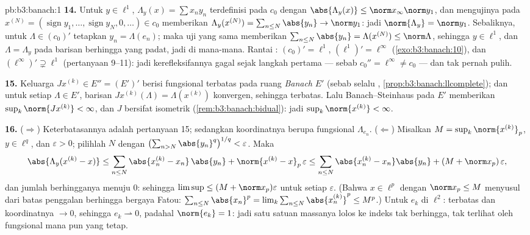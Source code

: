 \begin{solution}{pb:b3:banach:1}
\textbf{14.} Untuk $y \in \ell^1$, $\Lambda_y(x) = \sum x_ny_n$
terdefinisi pada $c_0$ dengan $\abs{\Lambda_y(x)} \leq \norm
x_\infty\norm y_1$, dan mengujinya pada $x^{(N)} =
(\operatorname{sign}y_1, \dots, \operatorname{sign}y_N, 0,
\dots) \in c_0$ memberikan $\Lambda_y(x^{(N)}) =
\sum_{n\leq N}\abs{y_n} \to \norm y_1$: jadi
$\norm{\Lambda_y} = \norm y_1$. Sebaliknya, untuk $\Lambda \in
(c_0)'$ tetapkan $y_n = \Lambda(e_n)$; maka uji yang sama memberikan
$\sum_{n \leq N}\abs{y_n} = \Lambda(x^{(N)}) \leq
\norm\Lambda$, sehingga $y \in \ell^1$, dan $\Lambda = \Lambda_y$ pada
barisan berhingga yang padat, jadi di mana-mana. Rantai
: $(c_0)' = \ell^1$, $(\ell^1)' = \ell^\infty$
(\cref{exo:b3:banach:10}), dan $(\ell^\infty)' \supsetneq \ell^1$
(pertanyaan 9--11): jadi kerefleksifannya gagal sejak langkah pertama
--- sebab $c_0'' = \ell^\infty \neq c_0$ --- dan tak pernah pulih.

\textbf{15.} Keluarga $J x^{(k)} \in E'' = (E')'$ berisi
fungsional terbatas pada ruang \emph{Banach} $E'$ (sebab 
selalu , \cref{prop:b3:banach:llcomplete}); dan untuk setiap
$\Lambda \in E'$, barisan $Jx^{(k)}(\Lambda) =
\Lambda(x^{(k)})$ konvergen, sehingga terbatas.
Lalu Banach--Steinhaus pada $E'$ memberikan $\sup_k\norm{Jx^{(k)}} <
\infty$, dan $J$ bersifat isometrik
(\cref{rem:b3:banach:bidual}): jadi $\sup_k\norm{x^{(k)}} <
\infty$.

\textbf{16.} ($\Rightarrow$) Keterbatasannya adalah pertanyaan 15;
sedangkan koordinatnya berupa fungsional $\Lambda_{e_n}$.
($\Leftarrow$) Misalkan $M = \sup_k\norm{x^{(k)}}_p$, $y \in
\ell^q$, dan $\varepsilon > 0$; pilihlah $N$ dengan
$\bigl(\sum_{n>N}\abs{y_n}^q\bigr)^{1/q} < \varepsilon$. Maka
\[
\abs{\Lambda_y(x^{(k)} - x)} \leq
\sum_{n\leq N}\abs{x^{(k)}_n - x_n}\,\abs{y_n} +
\norm{x^{(k)} - x}_p\,\varepsilon
\leq \sum_{n\leq N}\abs{x^{(k)}_n - x_n}\abs{y_n} +
(M + \norm x_p)\,\varepsilon,
\]
dan jumlah berhingganya menuju $0$: sehingga $\limsup \leq (M + \norm
x_p)\varepsilon$ untuk setiap $\varepsilon$. (Bahwa $x \in
\ell^p$ dengan $\norm x_p \leq M$ menyusul dari batas
penggalan berhingga bergaya Fatou: $\sum_{n \leq N}\abs{x_n}^p =
\lim_k\sum_{n\leq N}\abs{x^{(k)}_n}^p \leq M^p$.) Untuk $e_k$
di $\ell^2$: terbatas dan koordinatnya $\to 0$, sehingga $e_k
\rightharpoonup 0$, padahal $\norm{e_k} = 1$: jadi satu satuan massanya
lolos ke indeks tak berhingga, tak terlihat oleh fungsional
mana pun yang tetap.


\end{solution}
